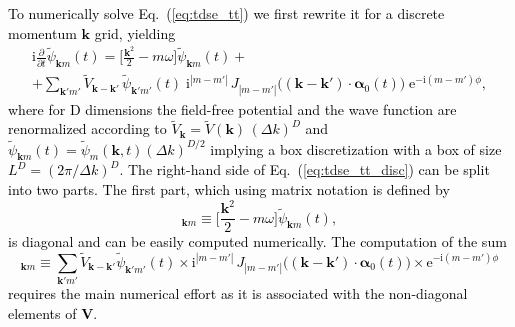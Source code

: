 \documentclass[
pra%
,preprint%
,amssymb, nobibnotes, aps, superscriptaddress, floatfix]{revtex4}
\renewcommand{\imath}{\mathrm{i}}
\newcommand{\av}{\boldsymbol{\alpha}}
\newcommand{\kv}{\mathbf{k}}
\newcommand{\phase}{\phi}
\newcommand{\psit}{\widetilde{\psi}}
\newcommand{\Vt}{\widetilde{V}}
\newcommand{\Tmat}{\mathbf{T}}
\newcommand{\Vmat}{\mathbf{V}}
\newcommand{\Pvec}{\boldsymbol{\psi}}
\newcommand{\dk}{\Delta k}
\newcommand{\Vidx}[1]{\Vt_{#1}}
\newcommand{\Pidx}[1]{\psit_{#1}}
\newcommand{\Pmk}{\Pidx{m}(\kv, t)} %
\newcommand{\Vdk}{\Vidx{\kv}}
\newcommand{\Vdkp}{\Vidx{\kv-\kv'}}
\newcommand{\Pdmk}{\Pidx{\kv m}(t)}
\newcommand{\Pdmkp}{\Pidx{\kv' m'}(t)}
\newcommand{\edit}[1]{\textcolor{black}{#1}}
\newcommand{\editt}[1]{\textcolor{black}{#1}}
\begin{document}
\editt{
To numerically solve Eq.~(\ref{eq:tdse_tt})  we first rewrite it for a discrete momentum $\kv$ grid, yielding
\begin{multline}
\imath \frac{\partial}{\partial t}\Pdmk = \Big[ \frac{\kv^2}{2} - m \omega \Big] \Pdmk +\\
+ \sum_{\kv' m'} \Vdkp \, \Pdmkp \;  
\imath^{|m-m'|} \, J_{|m-m'|}\big( (\kv-\kv') \cdot \av_0(t) \big) \; \mathrm{e}^{-\imath (m-m')\phase}, \label{eq:tdse_tt_disc}
\end{multline}
where for D dimensions the field-free potential and the wave function are renormalized according to $\Vdk {=} \widetilde{V}(\kv) \, (\dk)^D$ and $\Pdmk=\Pmk (\dk)^{D/2}$
implying a box discretization with a box of size $L^D=(2\pi/\dk)^D$.
}
\edit{
The right-hand side of Eq.~(\ref{eq:tdse_tt_disc}) can be split into two parts. The first part, which using matrix notation is defined by
\begin{equation}
[ \Tmat \cdot \Pvec ]_{\kv m} \equiv \Big[ \frac{\kv^2}{2} - m \omega \Big] \Pdmk,
\end{equation}
is diagonal and can be easily computed numerically. The computation of the sum
\begin{equation}
[ \Vmat \cdot \Pvec ]_{\kv m} \equiv \sum_{\kv' m'} \Vdkp \Pdmkp \times  
\imath^{|m-m'|} \, J_{|m-m'|}\big( (\kv-\kv') \cdot \av_0(t) \big) \times \mathrm{e}^{-\imath (m-m')\phase} \label{eq:potential_operator}
\end{equation}
requires the main numerical effort as it is associated with the non-diagonal elements of $\Vmat$.
}
\end{document}
